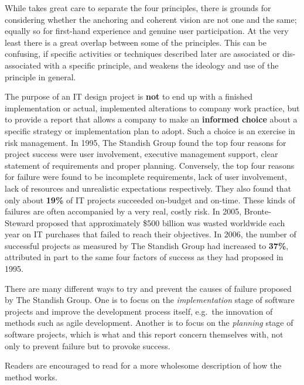 While \cite{bodker2004participatory} takes great care to separate the four
principles, there is grounds for considering whether the anchoring and coherent
vision are not one and the same; equally so for first-hand experience and
genuine user participation. At the very least there is a great overlap between
some of the principles. This can be confusing, if specific activities or
techniques described later are associated or dis-associated with a specific
principle, and weakens the ideology and use of the principle in general. 

The purpose of an IT design project is \textbf{not} to end up with a
finished implementation or actual, implemented alterations to company work
practice, but to provide a report that allows a company to make an
\textbf{informed choice} about a specific strategy or implementation plan to
adopt. Such a choice is an exercise in risk management. In 1995, The Standish
Group found the top four reasons for project success were user involvement,
executive management support, clear statement of requirements and proper
planning\cite{standish1995chaos}. Conversely, the top four reasons for failure
were found to be incomplete requirements, lack of user involvement, lack of
resources and unrealistic expectations respectively\cite{standish1995chaos}.
They also found that only about \textbf{19\%} of IT projects succeeded on-budget
and on-time. These kinds of failures are often accompanied by a very real, costly risk. 
In 2005, Bronte-Steward proposed that approximately \$500 billion was wasted
worldwide each year on IT purchases that failed to reach their
objectives\cite{bronte2005developing}. In 2006, the number of successful
projects as measured by The Standish Group\cite{standish2012} had increased to
\textbf{37\%}, attributed in part to the same four factors of success as they had
proposed in 1995. 

There are many different ways to try and prevent the causes of failure 
proposed by The Standish Group. One is to focus on the \textit{implementation} stage of
software projects and improve the development process itself, e.g.\ the
innovation of methods such as agile development. Another is to focus on the
\textit{planning} stage of software projects, which is what \must{} and this
report concern themselves with, not only to prevent failure but to provoke
success.

Readers are encouraged to read \cite{bodker2004participatory} for a more
wholesome description of how the \must{} method works.

